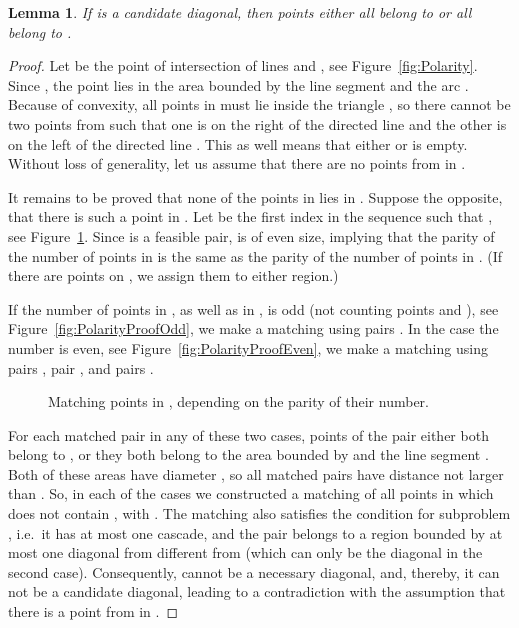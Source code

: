 \documentclass[a4paper, 11pt]{article}
\newtheorem{lemma}[theorem]{Lemma}
\begin{document}
\begin{lemma}
	\label{lem:Polarity}
	If  is a candidate diagonal, then points  either all belong to  or all belong to .
\end{lemma}
\begin{proof}
	Let  be the point of intersection of lines  and , see Figure~\ref{fig:Polarity}. Since , the point  lies in the area bounded by the line segment  and the arc . Because of convexity, all points in  must lie inside the triangle , so there cannot be two points from  such that one is on the right of the directed line  and the other is on the left of the directed line . This as well means that either  or  is empty. Without loss of generality, let us assume that there are no points from  in .
	
	It remains to be proved that none of the points in  lies in . Suppose the opposite, that there is such a point in . Let  be the first index in the sequence  such that , see Figure~\ref{fig:PolarityProof}. Since  is a feasible pair,  is of even size, implying that the parity of the number of points in  is the same as the parity of the number of points in . (If there are points on , we assign them to either region.)

	If the number of points in , as well as in , is odd (not counting points  and ), see Figure~\ref{fig:PolarityProofOdd}, we make a matching using pairs . In the case the number is even, see Figure~\ref{fig:PolarityProofEven}, we make a matching using pairs , pair , and pairs .
	
	\begin{figure}[ht]
		\centering
		\hspace{20pt}
		\caption{Matching points in , depending on the parity of their number.}
		\label{fig:PolarityProof}
	\end{figure}
		
	For each matched pair in any of these two cases, points of the pair either both belong to , or they both belong to the area bounded by  and the line segment . Both of these areas have diameter , so all matched pairs have distance not larger than . So, in each of the cases we constructed a matching  of all points in  which does not contain , with . The matching also satisfies the condition for subproblem , i.e.\ it has at most one cascade, and the pair  belongs to a region bounded by at most one diagonal from  different from  (which can only be the diagonal  in the second case). Consequently,  cannot be a necessary diagonal, and, thereby, it can not be a candidate diagonal, leading to a contradiction with the assumption that there is a point from  in .
\end{proof}
\end{document}
